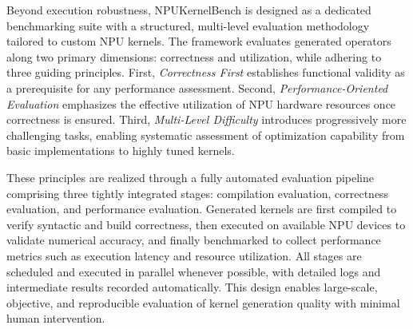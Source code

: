 Beyond execution robustness, NPUKernelBench is designed as a dedicated benchmarking suite with a structured, multi-level evaluation methodology tailored to custom NPU kernels. The framework evaluates generated operators along two primary dimensions: correctness and utilization, while adhering to three guiding principles. First, \emph{Correctness First} establishes functional validity as a prerequisite for any performance assessment. Second, \emph{Performance-Oriented Evaluation} emphasizes the effective utilization of NPU hardware resources once correctness is ensured. Third, \emph{Multi-Level Difficulty} introduces progressively more challenging tasks, enabling systematic assessment of optimization capability from basic implementations to highly tuned kernels.

These principles are realized through a fully automated evaluation pipeline comprising three tightly integrated stages: compilation evaluation, correctness evaluation, and performance evaluation. Generated kernels are first compiled to verify syntactic and build correctness, then executed on available NPU devices to validate numerical accuracy, and finally benchmarked to collect performance metrics such as execution latency and resource utilization. All stages are scheduled and executed in parallel whenever possible, with detailed logs and intermediate results recorded automatically. This design enables large-scale, objective, and reproducible evaluation of kernel generation quality with minimal human intervention.

